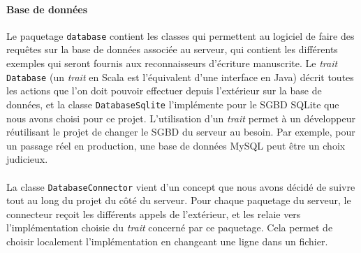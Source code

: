 \paragraph{Base de données}
Le paquetage \texttt{database} contient les classes qui permettent au logiciel de faire des requêtes sur la base de données associée au serveur, qui contient les différents exemples qui seront fournis aux reconnaisseurs d'écriture manuscrite. Le \textit{trait} \texttt{Database} (un \textit{trait} en Scala est l'équivalent d'une interface en Java) décrit toutes les actions que l'on doit pouvoir effectuer depuis l'extérieur sur la base de données, et la classe \texttt{DatabaseSqlite} l'implémente pour le SGBD SQLite que nous avons choisi pour ce projet. L'utilisation d'un \textit{trait} permet à un développeur réutilisant le projet de changer le SGBD du serveur au besoin. Par exemple, pour un passage réel en production, une base de données MySQL peut être un choix judicieux. 

\paragraph{}
La classe \texttt{DatabaseConnector} vient d'un concept que nous avons décidé de suivre tout au long du projet du côté du serveur. Pour chaque paquetage du serveur, le connecteur reçoit les différents appels de l'extérieur, et les relaie vers l'implémentation choisie du \textit{trait} concerné par ce paquetage. Cela permet de choisir localement l'implémentation en changeant une ligne dans un fichier.

\newpage

